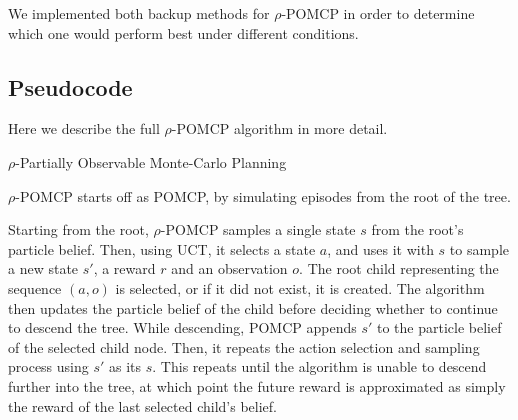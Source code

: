 We implemented both backup methods for $\rho$-POMCP in order to determine which one would perform
best under different conditions.

\subsection{Pseudocode}

Here we describe the full $\rho$-POMCP algorithm in more detail.

\begin{algorithm}[H]
    \caption{$\rho$-Partially Observable Monte-Carlo Planning}
\begin{multicols}{2}


    \setcounter{AlgoLine}{0}
\end{multicols}
\end{algorithm}

$\rho$-POMCP starts off as POMCP, by simulating episodes from the root of the tree.

Starting from the root, $\rho$-POMCP samples a single state $s$ from the root's particle belief.
Then, using UCT, it selects a state $a$, and uses it with $s$ to sample a new state $s'$, a reward
$r$ and an observation $o$. The root child representing the sequence $(a,o)$ is selected, or if it
did not exist, it is created. The algorithm then updates the particle belief of the child before
deciding whether to continue to descend the tree. While descending, POMCP appends $s'$ to the
particle belief of the selected child node. Then, it repeats the action selection and sampling
process using $s'$ as its $s$. This repeats until the algorithm is unable to descend further into
the tree, at which point the future reward is approximated as simply the reward of the last
selected child's belief.

